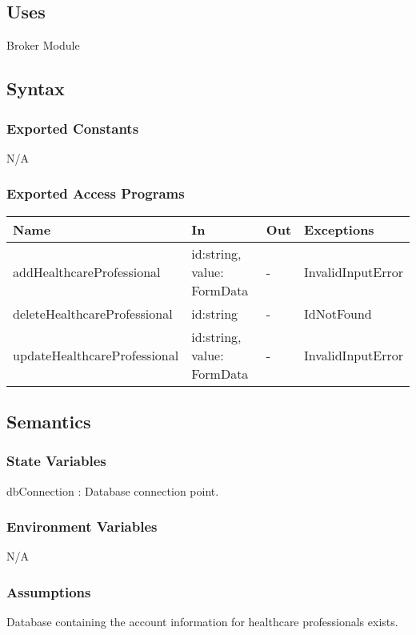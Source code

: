 \documentclass[12pt, titlepage]{article}
\begin{document}
\subsection{Uses}
Broker Module\\

\subsection{Syntax}

\subsubsection{Exported Constants}
N/A

\subsubsection{Exported Access Programs}

\begin{center}
\begin{tabular}{p{4cm} p{4.5cm} p{1cm} p{2.5cm}}
\hline
\textbf{Name} & \textbf{In} & \textbf{Out} & \textbf{Exceptions} \\
\hline
addHealthcareProfessional & id:string, value: FormData & - & InvalidInputError \\
deleteHealthcareProfessional & id:string & - & IdNotFound\\
updateHealthcareProfessional & id:string, value: FormData & - & InvalidInputError \\
\hline
\end{tabular}
\end{center}

\subsection{Semantics}

\subsubsection{State Variables}
dbConnection : Database connection point.

\subsubsection{Environment Variables}
N/A

\subsubsection{Assumptions}
Database containing the account information for healthcare professionals exists.
\end{document}
